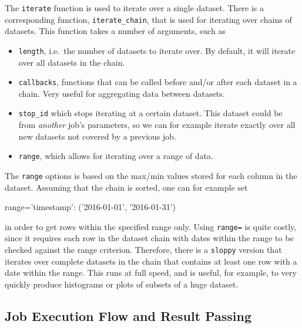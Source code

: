 The \texttt{iterate} function is used to iterate over a single
dataset.  There is a corresponding function, \texttt{iterate\_chain},
that is used for iterating over chains of datasets.  This function
takes a number of arguments, such as
\begin{itemize}
\item[] \texttt{length}, i.e.\ the number of datasets to iterate over.
  By default, it will iterate over all datasets in the chain.
\item[] \texttt{callbacks}, functions that can be called before and/or
  after each dataset in a chain.  Very useful for aggregating data
  between datasets.
\item[] \texttt{stop\_id} which stops iterating at a certain dataset.
  This dataset could be from \textsl{another} job's parameters, so we
  can for example iterate exactly over all new datasets not covered by
  a previous job.
\item[] \texttt{range}, which allows for iterating over a range of
  data.
\end{itemize}
The \texttt{range} options is based on the max/min values stored for
each column in the dataset.  Assuming that the chain is sorted, one
can for example set
\begin{python}
range={'timestamp': ('2016-01-01', '2016-01-31')}
\end{python}
in order to get rows within the specified range only.  Using
\texttt{range=} is quite costly, since it requires each row in the
dataset chain with dates within the range to be checked against the
range criterion.  Therefore, there is a \texttt{sloppy} version that
iterates over complete datasets in the chain that contains at least
one row with a date within the range.  This runs at full speed, and is
useful, for example, to very quickly produce histograms or plots of
subsets of a huge dataset.



\subsection{Job Execution Flow and Result Passing}

